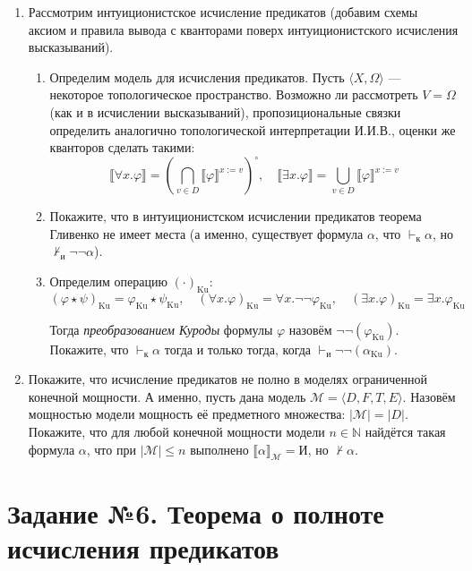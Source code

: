 \documentclass[10pt,a4paper,oneside]{article}
\begin{document}
\begin{enumerate}
\item Рассмотрим интуиционистское исчисление предикатов (добавим схемы аксиом и правила вывода с кванторами
поверх интуиционистского исчисления высказываний).
\begin{enumerate}
\item Определим модель для исчисления предикатов. Пусть $\langle X, \Omega\rangle$ --- некоторое топологическое
пространство. Возможно ли рассмотреть $V = \Omega$ (как и в исчислении высказываний),
пропозициональные связки определить аналогично топологической интерпретации И.И.В., 
оценки же кванторов сделать такими:
$$\llbracket \forall x.\varphi \rrbracket = \left(\bigcap_{v \in D} \llbracket \varphi \rrbracket^{x := v}\right)^\circ,\quad
  \llbracket \exists x.\varphi \rrbracket = \bigcup_{v \in D} \llbracket \varphi \rrbracket^{x := v}$$

\item Покажите, что в интуиционистском исчислении предикатов теорема Гливенко не имеет места
(а именно, существует формула $\alpha$, что $\vdash_\text{к}\alpha$, но $\not\vdash_\text{и}\neg\neg\alpha$).
\item Определим операцию $(\cdot)_\text{Ku}$:
$$(\varphi\star\psi)_\text{Ku} = \varphi_\text{Ku} \star \psi_\text{Ku}, \quad 
(\forall x.\varphi)_\text{Ku} = \forall x.\neg\neg\varphi_\text{Ku}, \quad
(\exists x.\varphi)_\text{Ku} = \exists x.\varphi_\text{Ku}$$

Тогда \emph{преобразованием Куроды} формулы $\varphi$ назовём $\neg\neg(\varphi_\text{Ku})$. 
Покажите, что $\vdash_\text{к}\alpha$ тогда и только тогда, когда $\vdash_\text{и}\neg\neg(\alpha_\text{Ku})$.
\end{enumerate}

\item Покажите, что исчисление предикатов не полно в моделях ограниченной конечной мощности. 
А именно, пусть дана модель $\mathcal{M} = \langle D, F, T, E \rangle$. 
Назовём мощностью модели мощность её предметного множества: $|\mathcal{M}| = |D|$.
Покажите, что для любой конечной мощности модели $n\in\mathbb{N}$ найдётся такая формула $\alpha$, что 
при $|\mathcal{M}|\le n$ выполнено $\llbracket\alpha\rrbracket_\mathcal{M} = \text{И}$, но $\not\vdash\alpha$.
\end{enumerate}

\section*{Задание №6. Теорема о полноте исчисления предикатов}
\end{document}
